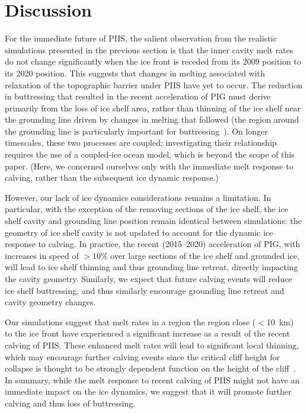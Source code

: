 \documentclass[draft]{agujournal2019}
\begin{document}
\section{Discussion}\label{S:Discussion}

For the immediate future of PIIS, the salient observation from the realistic simulations presented in the previous section is that the inner cavity melt rates do not change significantly when the ice front is receded from its 2009 position to its 2020 position. This suggests that changes in melting associated with relaxation of the topographic barrier under PIIS have yet to occur. The reduction in buttressing that resulted in the recent acceleration of PIG \cite{Joughin2021ScienceAdv} must derive primarily from  the loss of ice shelf area, rather than thinning of the ice shelf near the grounding line driven by changes in melting that followed (the region around the grounding line is particularly important for buttressing~\cite{Reese2018NatureClimCh}). On longer timescales, these two processes are coupled; investigating their relationship requires the use of a coupled-ice ocean model, which is beyond the scope of this paper. (Here, we concerned ourselves only with the immediate melt response to calving, rather than the subsequent ice dynamic response.)

However, our lack of ice dynamics considerations remains a limitation. In particular, with the exception of the removing sections of the ice shelf, the ice shelf cavity and grounding line position remain identical between simulations: the geometry of ice shelf cavity is not updated to account for the dynamic ice response to calving. In practice, the recent (2015--2020) acceleration of PIG, with increases in speed of $>$10\% over large sections of the ice shelf and grounded ice, will lead to ice shelf thinning and thus grounding line retreat, directly impacting the cavity geometry. Similarly, we expect that future calving events will reduce ice shelf buttressing, and thus similarly encourage grounding line retreat and cavity geometry changes. 

Our simulations suggest that melt rates in a region the region close ($<$10~km) to the ice front have experienced a significant increase as a result of the recent calving of PIIS. These enhanced melt rates will lead to significant local thinning, which may encourage further calving events since the critical cliff height for collapse is thought to be strongly dependent function on the height of the cliff~\cite[ for example]{Crawford2021NatureComms}. In summary, while the melt response to recent calving of PIIS might not have an immediate impact on the ice dynamics, we suggest that it will promote further calving and thus loss of buttressing.
\end{document}
